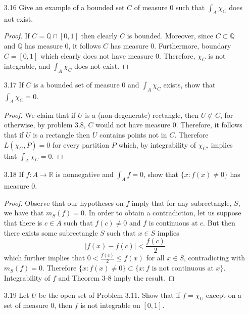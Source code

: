 \begin{enumerate}
    \item[3.16] Give an example of a bounded set \( C \) of measure \( 0 \) such that \( \int_A \chi_C \) does not exist.
    
    \begin{proof}
    If \( C = \mathbb{Q} \cap [0,1] \) then clearly \( C \) is bounded. Moreover, since \( C \subset \mathbb{Q} \) and \( \mathbb{Q} \) has measure \( 0 \), it follows \( C \) has measure \( 0 \). Furthermore, boundary \( C = [0,1] \) which clearly does not have measure \( 0 \). Therefore, \( \chi_C \) is not integrable, and \( \int_A \chi_C \) does not exist.
    \end{proof}
    
    \item[3.17] If \( C \) is a bounded set of measure \( 0 \) and \( \int_A \chi_C \) exists, show that \( \int_A \chi_C = 0 \).
    
    \begin{proof}
    We claim that if \( U \) is a (non-degenerate) rectangle, then \( U \not\subset C \), for otherwise, by problem 3.8, \( C \) would not have measure \( 0 \). Therefore, it follows that if \( U \) is a rectangle then \( U \) contains points not in \( C \). Therefore \( L(\chi_C, P) = 0 \) for every partition \( P \) which, by integrability of \( \chi_C \), implies that \( \int_A \chi_C = 0 \).
    \end{proof}
    
    \item[3.18] If \( f:A \rightarrow \mathbb{R} \) is nonnegative and \( \int_A f = 0 \), show that \( \{ x: f(x) \neq 0 \} \) has measure \( 0 \).
    
    \begin{proof}
    Observe that our hypotheses on \( f \) imply that for any subrectangle, \( S \), we have that \( m_S(f) = 0 \). In order to obtain a contradiction, let us suppose that there is \( c \in A \) such that \( f(c) \neq 0 \) and \( f \) is continuous at \( c \). But then there exists some subrectangle \( S \) such that \( x \in S \) implies
    \[
    \left| f(x) - f(c) \right| < \frac{f(c)}{2}
    \]
    which further implies that \( 0 < \frac{f(c)}{2} \leq f(x) \) for all \( x \in S \), contradicting with \( m_S(f) = 0 \). Therefore \( \{x: f(x) \neq 0 \} \subset \{ x: f \text{ is not continuous at } x \} \). Integrability of \( f \) and Theorem 3-8 imply the result.
    \end{proof}
    
    \item[3.19] Let \( U \) be the open set of Problem 3.11. Show that if \( f = \chi_U \) except on a set of measure \( 0 \), then \( f \) is not integrable on \( [0,1] \).
    

\end{enumerate}
